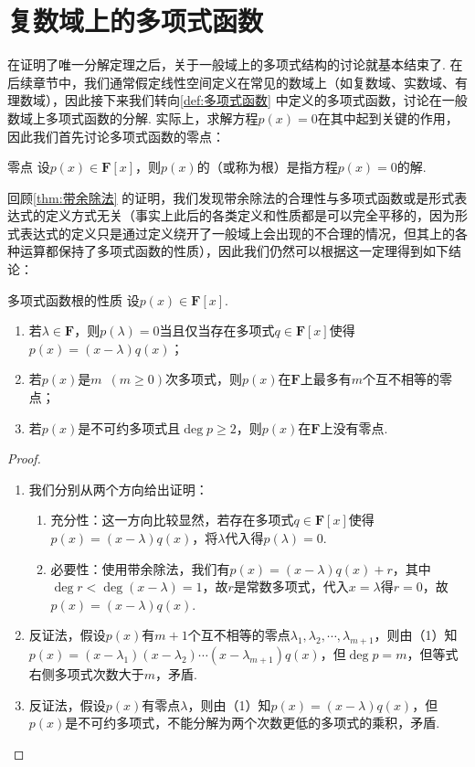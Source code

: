 \section{复数域上的多项式函数}
在证明了唯一分解定理之后，关于一般域上的多项式结构的讨论就基本结束了. 在后续章节中，我们通常假定线性空间定义在常见的数域上（如复数域、实数域、有理数域），因此接下来我们转向\autoref{def:多项式函数} 中定义的多项式函数，讨论在一般数域上多项式函数的分解. 实际上，求解方程$p(x)=0$在其中起到关键的作用，因此我们首先讨论多项式函数的零点：
\begin{definition}{零点}{}
    设$p(x)\in\mathbf{F}[x]$，则$p(x)$的（或称为根）是指方程$p(x)=0$的解.
\end{definition}

回顾\autoref{thm:带余除法} 的证明，我们发现带余除法的合理性与多项式函数或是形式表达式的定义方式无关（事实上此后的各类定义和性质都是可以完全平移的，因为形式表达式的定义只是通过定义绕开了一般域上会出现的不合理的情况，但其上的各种运算都保持了多项式函数的性质），因此我们仍然可以根据这一定理得到如下结论：
\begin{theorem}{}{多项式函数根的性质}
    设$p(x)\in\mathbf{F}[x]$.
    \begin{enumerate}
        \item 若$\lambda\in\mathbf{F}$，则$p(\lambda)=0$当且仅当存在多项式$q\in\mathbf{F}[x]$使得$p(x)=(x-\lambda)q(x)$；
        \item 若$p(x)$是$m\enspace(m \geqslant 0)$次多项式，则$p(x)$在$\mathbf{F}$上最多有$m$个互不相等的零点；
        \item 若$p(x)$是不可约多项式且$\deg p\geqslant 2$，则$p(x)$在$\mathbf{F}$上没有零点.
    \end{enumerate}
\end{theorem}
\begin{proof}
    \begin{enumerate}
        \item 我们分别从两个方向给出证明：
              \begin{enumerate}
                  \item 充分性：这一方向比较显然，若存在多项式$q\in\mathbf{F}[x]$使得$p(x)=(x-\lambda)q(x)$，将$\lambda$代入得$p(\lambda)=0$.
                  \item 必要性：使用带余除法，我们有$p(x)=(x-\lambda)q(x)+r$，其中$\deg r<\deg(x-\lambda)=1$，故$r$是常数多项式，代入$x=\lambda$得$r=0$，故$p(x)=(x-\lambda)q(x)$.
              \end{enumerate}
        \item 反证法，假设$p(x)$有$m+1$个互不相等的零点$\lambda_1,\lambda_2,\cdots,\lambda_{m+1}$，则由（1）知$p(x)=(x-\lambda_1)(x-\lambda_2)\cdots(x-\lambda_{m+1})q(x)$，但$\deg p=m$，但等式右侧多项式次数大于$m$，矛盾.
        \item 反证法，假设$p(x)$有零点$\lambda$，则由（1）知$p(x)=(x-\lambda)q(x)$，但$p(x)$是不可约多项式，不能分解为两个次数更低的多项式的乘积，矛盾.
    \end{enumerate}
\end{proof}

